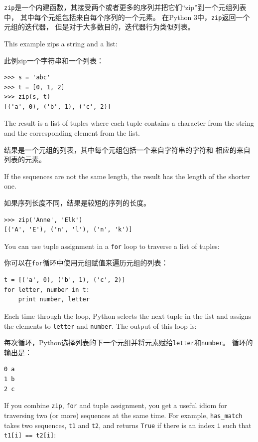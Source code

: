 \documentclass[10pt]{book}
\begin{document}
\begin{CJK}{UTF8}{gbsn}
{\tt zip}是一个内建函数，其接受两个或者更多的序列并把它们``zip''到一个元组列表中，
其中每个元组包括来自每个序列的一个元素。
在Python 3中，{\tt zip}返回一个元组的迭代器，
但是对于大多数目的，迭代器行为类似列表。

This example zips a string and a list:

此例zip一个字符串和一个列表：

\begin{verbatim}
>>> s = 'abc'
>>> t = [0, 1, 2]
>>> zip(s, t)
[('a', 0), ('b', 1), ('c', 2)]
\end{verbatim}
%
The result is a list of tuples where each tuple contains
a character from the string and the corresponding element from
the list.

结果是一个元组的列表，其中每个元组包括一个来自字符串的字符和
相应的来自列表的元素。

If the sequences are not the same length, the result has the
length of the shorter one.

如果序列长度不同，结果是较短的序列的长度。

\begin{verbatim}
>>> zip('Anne', 'Elk')
[('A', 'E'), ('n', 'l'), ('n', 'k')]
\end{verbatim}
%
You can use tuple assignment in a {\tt for} loop to traverse a list of
tuples:

你可以在{\tt for}循环中使用元组赋值来遍历元组的列表：

\begin{verbatim}
t = [('a', 0), ('b', 1), ('c', 2)]
for letter, number in t:
    print number, letter
\end{verbatim}
%
Each time through the loop, Python selects the next tuple in
the list and assigns the elements to {\tt letter} and 
{\tt number}.  The output of this loop is:

每次循环，Python选择列表的下一个元组并将元素赋给{\tt letter}和{\tt number}。
循环的输出是：

\begin{verbatim}
0 a
1 b
2 c
\end{verbatim}
%
If you combine {\tt zip}, {\tt for} and tuple assignment, you get a
useful idiom for traversing two (or more) sequences at the same
time.  For example, \verb"has_match" takes two sequences, {\tt t1} and
{\tt t2}, and returns {\tt True} if there is an index {\tt i}
such that {\tt t1[i] == t2[i]}:


\end{CJK}
\end{document}
